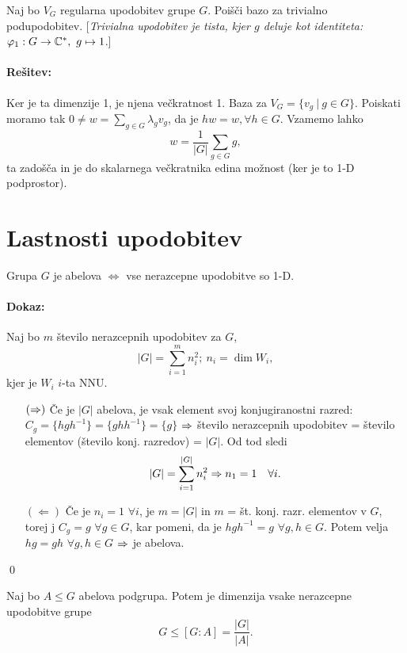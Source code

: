 \begin{zgled}
	Naj bo $V_G$ regularna upodobitev grupe $G$. Poi\v s\v ci bazo za trivialno podupodobitev. [{\em Trivialna upodobitev je tista,
	kjer $g$ deluje kot identiteta: $\vfi_1 : G \to \C^*,\ g \mapsto 1$}.]

	\paragraph{Re\v sitev:} Ker je ta dimenzije 1, je njena ve\v ckratnost 1. Baza za $V_G = \{v_g\ |\ g \in G\}$. Poiskati moramo
	tak $0 \neq w = \sum_{g \in G}\lambda_g v_g$, da je $hw = w, \forall h \in G$. Vzamemo lahko
	\[
		w = \frac{1}{|G|}\sum_{g \in G} g,
	\]
	ta zado\v s\v ca in je do skalarnega ve\v ckratnika edina mo\v znost (ker je to 1-D podprostor).
\end{zgled}

\pagebreak
\section{Lastnosti upodobitev}

\begin{trditev}
Grupa $G$ je abelova $\iff$ vse nerazcepne upodobitve so 1-D.
\end{trditev}

\paragraph{Dokaz:} Naj bo $m$ \v stevilo nerazcepnih upodobitev za $G$,
\[
	|G| = \sum_{i = 1}^{m} n_i^2;\ n_i = \dim W_i,
\]
kjer je $W_i$ $i$-ta NNU.
\begin{itemize}
	\item[$(\Rightarrow)$]{\v Ce je $|G|$ abelova, je vsak element svoj konjugiranostni razred: $C_g = \{hgh^{-1}\} =
		\{ghh^{-1}\} = \{g\}$ $\Rightarrow$ \v stevilo nerazcepnih upodobitev = \v stevilo elementov (\v stevilo konj.
		razredov) = $|G|$. Od tod sledi
		\[
			|G| = \sum_{i = 1}^{|G|}n^2_i \Rightarrow n_1 = 1 \quad \forall i.
		\]}
	\item[$(\Leftarrow)$]{\v Ce je $n_i = 1$ $\forall i$, je $m = |G|$ in $m$ = \v st. konj. razr. elementov v $G$, torej j
		$C_g = g$ $\forall g \in G$, kar pomeni, da je $hgh^{-1} = g$ $\forall g,h \in G$. Potem velja
		$hg = gh$ $\forall g, h \in G$ $\Rightarrow$ je abelova.}
\end{itemize}
\qed

\begin{posledica}
	Naj bo $A \leq G$ abelova podgrupa. Potem je dimenzija vsake nerazcepne upodobitve grupe
	\[
		G \leq [G : A] = \frac{|G|}{|A|}.
	\]
\end{posledica}

